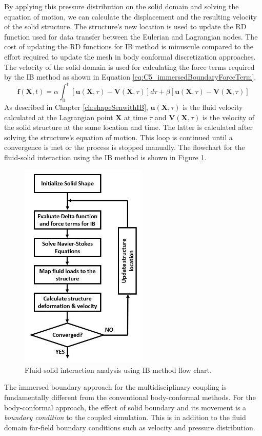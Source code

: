 By applying this pressure distribution on the solid domain and solving the equation of motion, we can calculate the displacement and the resulting velocity of the solid structure. The structure's new location is used to update the RD function used for data transfer between the Eulerian and Lagrangian nodes. The cost of updating the RD functions for IB method is minuscule compared to the effort required to update the mesh in body conformal discretization approaches. The velocity of the solid domain is used for calculating the force terms required by the IB method as shown in Equation \eqref{eq:C5_immersedBoundaryForceTerm}.
%
\begin{equation}\label{eq:C5_immersedBoundaryForceTerm}
    \mathbf{f}(\mathbf{X}, t) = 
    \alpha \int_0^t \left[ \mathbf{u}(\mathbf{X}, \tau) - \mathbf{V}(\mathbf{X}, \tau) \right] d\tau + 
    \beta \left[ \mathbf{u}(\mathbf{X}, \tau) - \mathbf{V}(\mathbf{X}, \tau) \right]
\end{equation}
%
As described in Chapter \ref{ch:shapeSenwithIB}, $\mathbf{u}(\mathbf{X}, \tau)$ is the fluid velocity calculated at the Lagrangian point $\mathbf{X}$ at time $\tau$ and $\mathbf{V}(\mathbf{X}, \tau)$ is the velocity of the solid structure at the same location and time. The latter is calculated after solving the structure's equation of motion. This loop is continued until a convergence is met or the process is stopped manually. The flowchart for the fluid-solid interaction using the IB method is shown in Figure \ref{fig:C5_FSIflowchart}.
%
\begin{figure}[H]
    \centering
    \includegraphics[width=6.00cm]{Chapter_5/figure/Chapter5_FSI_FlowChart.jpg}
    \caption{Fluid-solid interaction analysis using IB method flow chart.}
    \label{fig:C5_FSIflowchart}
\end{figure}
%
The immersed boundary approach for the multidisciplinary coupling is fundamentally different from the conventional body-conformal methods. For the body-conformal approach, the effect of solid boundary and its movement is a \emph{boundary condition} to the coupled simulation. This is in addition to the fluid domain far-field boundary conditions such as velocity and pressure distribution.


